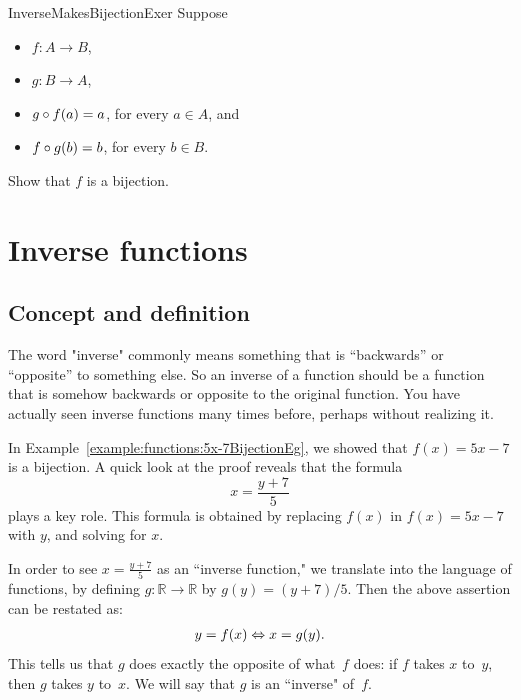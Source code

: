  

 \begin{exercise}{InverseMakesBijectionExer}
 Suppose 
 \begin{itemize}
 \item $f \colon A \to B$,
 \item  $g \colon B \to A$,
 \item $g \circ f(a) = a$, for every $a \in A$,
 and
 \item $f \circ g(b) = b$, for every $b \in B$.
 \end{itemize}
 Show that $f$ is a bijection.
 \end{exercise}
  
 
 \section{Inverse functions\quad
{}} \label{inverse}

\subsection{Concept and definition}

The word "inverse" commonly means something that is ``backwards'' or ``opposite'' to something else.  So an inverse of a function should be  a function that is somehow backwards or opposite to the original  function.  
You have actually seen inverse functions many times before, perhaps without realizing it.

\begin{example}{}
In Example~\ref{example:functions:5x-7BijectionEg}, we showed that $f(x) = 5x - 7$ is a bijection. A quick look at the proof reveals that the formula
$$x =  \frac{y+7}{5} $$
plays a key role.  This formula is obtained by replacing $f(x)$ in $f(x) = 5x - 7$ with $y$, and solving for $x$.

In order to see $x = \frac{y+7}{5}$ as an ``inverse function," we translate into the language of functions, by defining $g \colon \mathbb{R} \to \mathbb{R}$  by $g(y) = (y+7)/5$. Then the above assertion can be restated as:
\begin{align*} \label{y=f(x)<>x=g(y)}
 y = f(x) \Leftrightarrow x = g(y) .
 \end{align*}
This tells us that $g$ does exactly the opposite of what~$f$ does: if $f$ takes $x$ to~$y$, then $g$ takes $y$ to~$x$. We will say that $g$ is an ``inverse" of~$f$.
\end{example}

